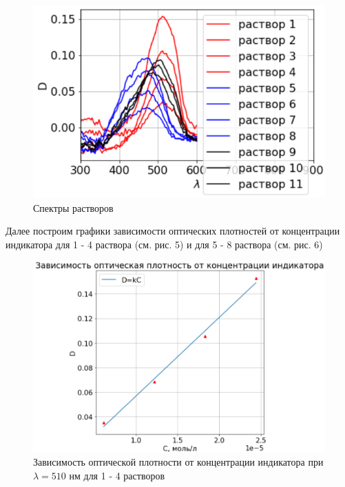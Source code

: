 \documentclass[a4paper,12pt]{article}
\begin{document}
\begin{figure}[H]
    \centering
    \includegraphics[scale=0.75]{Спектры растворов.png}
    \centering
    \caption{Спектры растворов}
\end{figure}

Далее построим графики зависимости оптических плотностей от концентрации индикатора для 1 - 4 раствора (см. рис. 5) и для 5 - 8 раствора (см. рис. 6)

\begin{figure}[H]
    \centering
    \includegraphics[scale=0.75]{1-4.png}
    \centering
    \caption{Зависимость оптической плотности от концентрации индикатора при $\lambda = 510$ нм для 1 - 4 растворов}
\end{figure}
\end{document}
